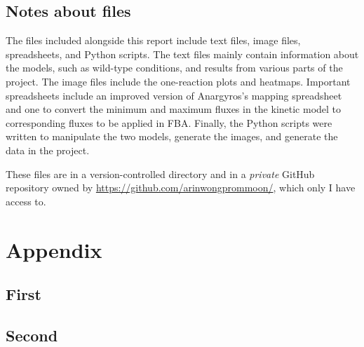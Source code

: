 \documentclass[parskip=full]{scrreprt}
\begin{document}
\section{Notes about files}
\label{sec:files}

The files included alongside this report include text files, image files, spreadsheets, and Python scripts. The text files mainly contain information about the models, such as wild-type conditions, and results from various parts of the project. The image files include the one-reaction plots and heatmaps. Important spreadsheets include an improved version of Anargyros's mapping spreadsheet and one to convert the minimum and maximum fluxes in the kinetic model to corresponding fluxes to be applied in FBA. Finally, the Python scripts were written to manipulate the two models, generate the images, and generate the data in the project.

These files are in a version-controlled directory and in a \emph{private} GitHub repository owned by \url{https://github.com/arinwongprommoon/}, which only I have access to.

\appendix
\chapter*{Appendix}
\renewcommand{\thesection}{\Alph{section}}

\section{First}
\section{Second}

\nocite{*}
\printbibliography
\end{document}
